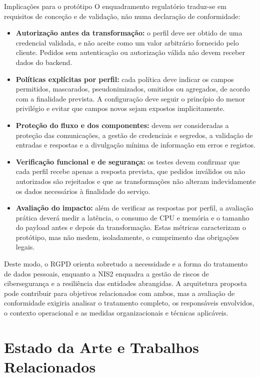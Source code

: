 \documentclass[12pt,reqno, twoside]{amsbook}
\makeatletter
\def\section{\@startsection{section}{1}%
      \z@{.5\linespacing\@plus.7\linespacing}{.25\linespacing}%
      {\normalfont\bfseries\flushleft}}
\theoremstyle{plain}
\numberwithin{equation}{chapter}
\numberwithin{table}{chapter}
\numberwithin{figure}{chapter}
\numberwithin{section}{chapter}
\makeatother
\begin{document}
\section{Implicações para o protótipo}
\noindent O enquadramento regulatório traduz-se em requisitos de conceção e de validação, não numa declaração de conformidade:
\begin{itemize}[leftmargin=*]
    \item \textbf{Autorização antes da transformação:} o perfil deve ser obtido de uma credencial validada, e não aceite como um valor arbitrário fornecido pelo cliente. Pedidos sem autenticação ou autorização válida não devem receber dados do backend.
    \item \textbf{Políticas explícitas por perfil:} cada política deve indicar os campos permitidos, mascarados, pseudonimizados, omitidos ou agregados, de acordo com a finalidade prevista. A configuração deve seguir o princípio do menor privilégio e evitar que campos novos sejam expostos implicitamente.
    \item \textbf{Proteção do fluxo e dos componentes:} devem ser consideradas a proteção das comunicações, a gestão de credenciais e segredos, a validação de entradas e respostas e a divulgação mínima de informação em erros e registos.
    \item \textbf{Verificação funcional e de segurança:} os testes devem confirmar que cada perfil recebe apenas a resposta prevista, que pedidos inválidos ou não autorizados são rejeitados e que as transformações não alteram indevidamente os dados necessários à finalidade do serviço.
    \item \textbf{Avaliação do impacto:} além de verificar as respostas por perfil, a avaliação prática deverá medir a latência, o consumo de CPU e memória e o tamanho do payload antes e depois da transformação. Estas métricas caracterizam o protótipo, mas não medem, isoladamente, o cumprimento das obrigações legais.
\end{itemize}

\noindent Deste modo, o RGPD orienta sobretudo a necessidade e a forma do tratamento de dados pessoais, enquanto a NIS2 enquadra a gestão de riscos de cibersegurança e a resiliência das entidades abrangidas. A arquitetura proposta pode contribuir para objetivos relacionados com ambos, mas a avaliação de conformidade exigiria analisar o tratamento completo, os responsáveis envolvidos, o contexto operacional e as medidas organizacionais e técnicas aplicáveis.

\chapter{Estado da Arte e Trabalhos Relacionados}
\end{document}
